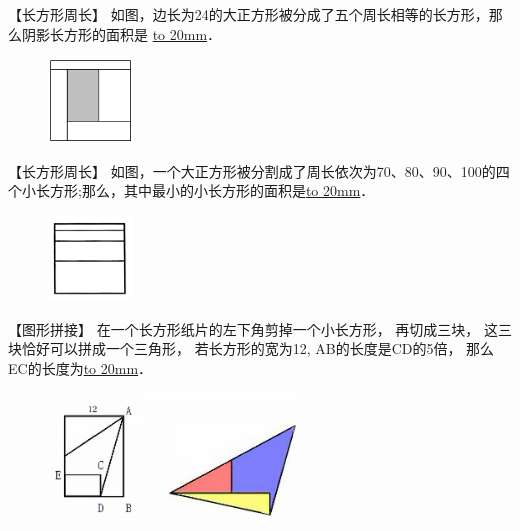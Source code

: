 \item {
    【长方形周长】
    如图，边长为24的大正方形被分成了五个周长相等的长方形，那么阴影长方形的面积是 \underline{\hbox to 20mm{}}．
    \begin{figure}[H] 
        \centering
        \includegraphics[width=0.2\textwidth]{./pics/Chapter_3/2.png}
    \end{figure}
    \vspace{1cm}
}
\item {
    【长方形周长】
    如图，一个大正方形被分割成了周长依次为70、80、90、100的四个小长方形;那么，其中最小的小长方形的面积是\underline{\hbox to 20mm{}}．
    \begin{figure}[H] 
        \centering
        \includegraphics[width=0.2\textwidth]{./pics/Chapter_3/4.png}
    \end{figure}
    \vspace{1cm}
}
\item {
    【图形拼接】
    {在一个长方形纸片的左下角剪掉一个小长方形，
    再切成三块， 这三块恰好可以拼成一个三角形，
    若长方形的宽为12, AB的长度是CD的5倍，
    那么EC的长度为\underline{\hbox to 20mm{}}．} 
    \begin{figure}[H] 
        \centering
        \includegraphics[width=0.6\textwidth]{./pics/Chapter_3/6.png}
    \end{figure}
    \vspace{1cm}
}

